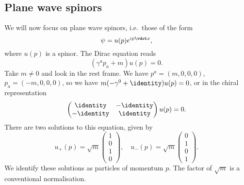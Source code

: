 \documentclass{jknotes} %
\begin{document}
\subsection{Plane wave spinors}
We will now focus on plane wave spinors, i.e.\ those of the form 
\begin{equation}
    \psi = u(p)e^{ip\vdot x},
\end{equation}
where \(u(p)\) is a spinor. The Dirac equation reads
\begin{equation}
    (\gamma^a p_a + m) u(p) = 0.
\end{equation}
Take \(m\ne0\) and look in the rest frame. We have \(p^a = (m,0,0,0)\), \(p_a = (-m,0,0,0)\), so we have \(m(-\gamma^0 + \identity)u(p)=0\), or in the chiral representation
\begin{equation}
    \begin{pmatrix}
        \identity & -\identity \\
        -\identity & \identity 
    \end{pmatrix} u(p) = 0.
\end{equation}
There are two solutions to this equation, given by
\begin{equation}
    u_+(p) = \sqrt{m}
    \begin{pmatrix}
        1 \\ 0 \\ 1 \\ 0
    \end{pmatrix}
    ,\quad
    u_-(p) = \sqrt{m}
    \begin{pmatrix}
        0 \\ 1 \\ 0 \\ 1
    \end{pmatrix}.
\end{equation}
We identify these solutions as particles of momentum \(p\). The factor of \(\sqrt{m}\) is a conventional normalisation.
\end{document}
